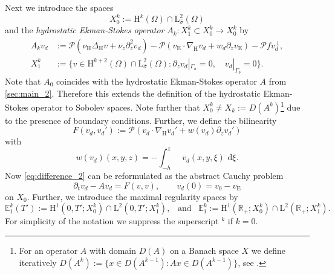 \documentclass[preprint]{elsarticle}
\numberwithin{equation}{section}
\newcommand {\R}	{\mathbb{R}}
\newcommand {\E}	{\mathbb{E}}
\renewcommand{\d}{\, \mathrm{d}}
\DeclareMathOperator{\divH}{div_{\H}}
\renewcommand{\H}{\mathrm{H}}
\newcommand{\sigmabar}{\bar{\sigma}}
\newcommand{\dk}[1]{\partial_{#1}}
\newcommand{\dt}{\dk{t}}
\newcommand{\dz}{\dk{z}}
\renewcommand{\bar}[1]{\overline{#1}}
\newcommand{\vbar}{\bar{v}}
\newcommand{\nablaH}{\nabla_{\H}}
\newcommand{\DeltaH}{\Delta_{\H}}
\newcommand{\rC}{\mathrm{C}}
\newcommand{\rL}{\mathrm{L}}
\newcommand{\rH}{\H}
\newcommand{\rE}{\mathrm{E}}
\renewcommand{\P}{\mathcal{P}}
\begin{document}
Next we introduce the spaces
\begin{equation*}
	X^k_0 := \rH^k(\Omega) \cap \rL^2_{\sigmabar}(\Omega)
\end{equation*}
and the
\emph{hydrostatic Ekman-Stokes operator} $A_k \colon X_1^k \subset X_0^k \to X_0^k$ by
\begin{equation}
	\begin{aligned} 
		A_k v_d &:= \P ( \nu_{\rH} \DeltaH v +\nu_z \partial_z^2 v_d)
		- \P (v_{\rE} \cdot \nablaH v_d 
		+ w_d \dz v_{\rE}) 
		- \P f v_d^\perp,
		\\
		X_1^k &:= \{ v \in \rH^{k+2}(\Omega) \cap \rL^2_{\sigmabar}(\Omega) \colon \partial_z v_d|_{\Gamma_u} = 0, \quad v_d|_{\Gamma_b} = 0 \} .
	\end{aligned} 
	\label{eq:A_2}
\end{equation} 
Note that $A_0$ coincides with the hydrostatic Ekman-Stokes operator $A$ from \autoref{sec:main_2}. Therefore this extends the definition of the hydrostatic Ekman-Stokes operator to Sobolev spaces. 
Note further that $X^k_0 \not = X_{k} := D(A^k)$\footnote{For an operator $A$ with domain $D(A)$ on a Banach space $X$ we define iteratively $D(A^k) := \{ x \in D(A^{k-1}) \colon A x \in D(A^{k-1}) \}$, see \cite[Section II.5]{EN:00_2}.} due to the presence of boundary conditions. 
Further, we define the bilinearity
\begin{equation*}
	F(v_d,v_d') := \P (v_d \cdot \nablaH v_d' + w(v_d) \dz v_d' ) 
\end{equation*}
with
\begin{equation}
	w(v_d)(x,y,z)
	= - \int_{-h}^z \divH v_d(x,y,\xi) \, \d \xi .
\end{equation}
Now \eqref{eq:difference_2} can be reformulated as the abstract Cauchy problem
\begin{equation}
	\dt v_d - A v_d = F(v,v), \qquad v_d(0) = v_0-v_{\rE} 
	\label{eq:acp_2}
\end{equation}
on $X_0$. 
Further, we introduce the maximal regularity spaces by
\begin{equation*}
	\E_1^k(T') := \rH^{1}(0,T';X_0^k) \cap \rL^2(0,T';X_1^k), \enspace \text{ and } \enspace 
	\E_1^k := \rH^{1}(\R_+;X_0^k) \cap \rL^2(\R_+;X_1^k). 
\end{equation*}
For simplicity of the notation we suppress the superscript $^k$ if $k =0$. 
\end{document}
